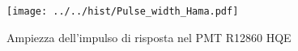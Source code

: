 \begin{figure}[h] \centering \texttt{[image: ../../hist/Pulse\_width\_Hama.pdf]}\caption{Ampiezza dell'impulso di risposta nel PMT R12860 HQE}\label{hist:Pulse_width_Hama} \end{figure}

